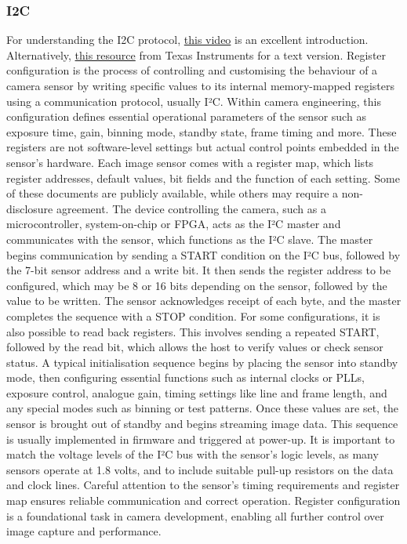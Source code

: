 \documentclass[10pt]{article}
\begin{document}
\begin{multicols}{2}
\subsubsection{I2C}
For understanding the I2C protocol, \href{https://www.youtube.com/watch?v=CAvawEcxoPU&t=419s}{this video} is an excellent introduction.
Alternatively, \href{https://www.ti.com/lit/an/slva704/slva704.pdf?ts=1752540634031&ref_url=https%253A%252F%252Fwww.google.com%252F}{this resource} from Texas Instruments for a text version.
\newline \newline
Register configuration is the process of controlling and customising the behaviour of a camera sensor by writing specific values to its internal memory-mapped registers using a communication protocol, usually I²C.
Within camera engineering, this configuration defines essential operational parameters of the sensor such as exposure time, gain, binning mode, standby state, frame timing and more.
These registers are not software-level settings but actual control points embedded in the sensor's hardware. Each image sensor comes with a register map, which lists register addresses, default values, bit fields and the function of each setting. Some of these documents are publicly available, while others may require a non-disclosure agreement.
\newline \newline
The device controlling the camera, such as a microcontroller, system-on-chip or FPGA, acts as the I²C master and communicates with the sensor, which functions as the I²C slave. 
The master begins communication by sending a START condition on the I²C bus, followed by the 7-bit sensor address and a write bit. It then sends the register address to be configured, which may be 8 or 16 bits depending on the sensor, followed by the value to be written.
The sensor acknowledges receipt of each byte, and the master completes the sequence with a STOP condition. For some configurations, it is also possible to read back registers. This involves sending a repeated START, followed by the read bit, which allows the host to verify values or check sensor status.
\newline \newline
A typical initialisation sequence begins by placing the sensor into standby mode, then configuring essential functions such as internal clocks or PLLs, exposure control, analogue gain, timing settings like line and frame length, and any special modes such as binning or test patterns.
Once these values are set, the sensor is brought out of standby and begins streaming image data. This sequence is usually implemented in firmware and triggered at power-up. It is important to match the voltage levels of the I²C bus with the sensor's logic levels, as many sensors operate at 1.8 volts, and to include suitable pull-up resistors on the data and clock lines.
Careful attention to the sensor's timing requirements and register map ensures reliable communication and correct operation. Register configuration is a foundational task in camera development, enabling all further control over image capture and performance.


\end{multicols}
\end{document}
